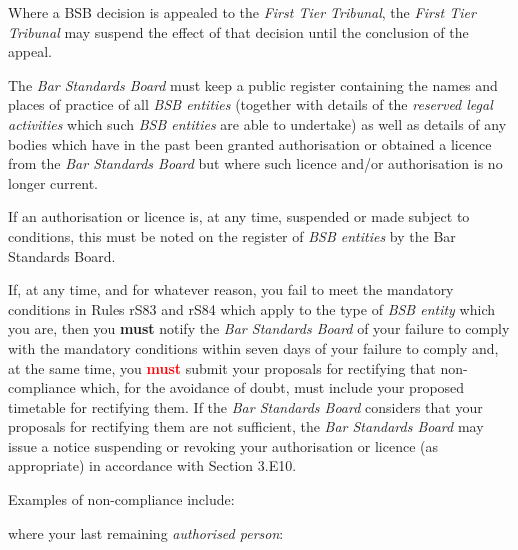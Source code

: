 
Where a BSB decision is appealed to the \emph{First Tier Tribunal}, the
\emph{First Tier Tribunal} may suspend the effect of that decision until
the conclusion of the appeal.




The \emph{Bar Standards Board} must keep a public register containing
the names and places of practice of all \emph{BSB entities} (together
with details of the \emph{reserved legal activities} which such
\emph{BSB entities} are able to undertake) as well as details of any
bodies which have in the past been granted authorisation or obtained a
licence from the \emph{Bar Standards Board} but where such licence
and/or authorisation is no longer current.


If an authorisation or licence is, at any time, suspended or made
subject to conditions, this must be noted on the register of \emph{BSB
entities} by the Bar Standards Board.







If, at any time, and for whatever reason, you fail to meet the mandatory
conditions in Rules rS83 and rS84 which apply to the type of \emph{BSB
entity} which you are, then you \textcolor{myred}{\textbf{must }}notify the \emph{Bar Standards
Board} of your failure to comply with the mandatory conditions within
seven days of your failure to comply and, at the same time, you \textcolor{red}{\textbf{must}}
submit your proposals for rectifying that non-compliance which, for the
avoidance of doubt, must include your proposed timetable for rectifying
them. If the \emph{Bar Standards Board} considers that your proposals
for rectifying them are not sufficient, the \emph{Bar Standards Board}
may issue a notice suspending or revoking your authorisation or licence
(as appropriate) in accordance with Section 3.E10.





Examples of non-compliance include:\nl\item where your last remaining \emph{authorised person}:

